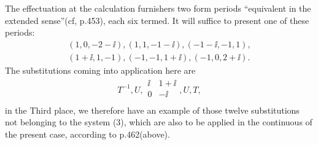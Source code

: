 The effectuation at the calculation furnishers two form periods “equivalent in the extended sense”(cf, p.453), each six termed. It will suffice to present one of these periods:
\begin{align}
    (1,0,-2-\ii),(1,1,-1-\ii),(-1-\ii,-1,1),\\
    (1+\ii,1,-1),(-1,-1,1+\ii),(-1,0,2+\ii).
\end{align}
The substitutions coming into application here are
\begin{align}
    T^{-1},U,\begin{array}{cc}
    \ii & 1+\ii\\
    0 & -\ii\\
    \end{array}, U, T,
\end{align}
in the Third place, we therefore have an example of those twelve substitutions not belonging to the system (3), which are also to be applied in the continuous of the present case, according to p.462(above).